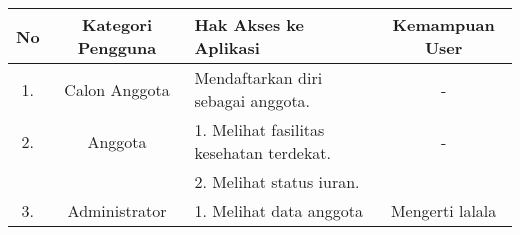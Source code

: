 \begin{table}[h]
		\centering
		\begin{tabular}{|c | c | l | c|}
			\hline
			No	& Kategori Pengguna	& Hak Akses ke Aplikasi 						& Kemampuan User\\
			\hline
			1.	& Calon Anggota		& Mendaftarkan diri sebagai anggota.			& -\\
			\hline
			2.	& Anggota			& 1. Melihat fasilitas kesehatan terdekat.		& -\\
				&					& 2. Melihat status iuran.						& \\
			\hline
			3. 	& Administrator		& 1. Melihat data anggota						& Mengerti lalala \\
			\hline
		\end{tabular}
	\end{table}
